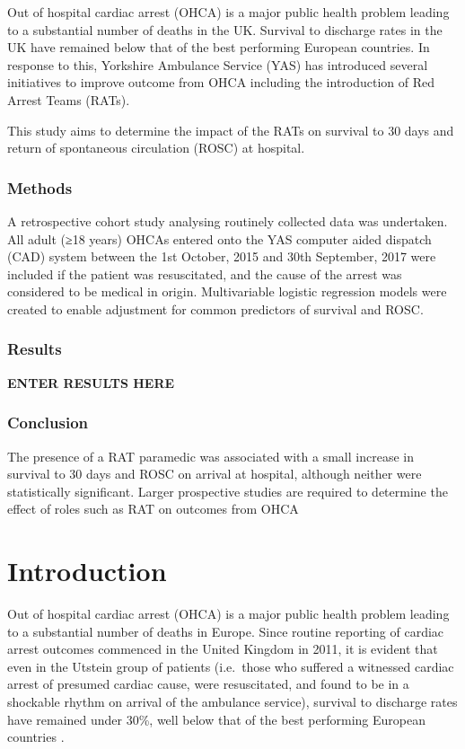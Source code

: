 \documentclass[]{article}
\theoremstyle{definition}
\theoremstyle{definition}
\theoremstyle{definition}
\theoremstyle{remark}
\begin{document}
Out of hospital cardiac arrest (OHCA) is a major public health problem
leading to a substantial number of deaths in the UK. Survival to
discharge rates in the UK have remained below that of the best
performing European countries. In response to this, Yorkshire Ambulance
Service (YAS) has introduced several initiatives to improve outcome from
OHCA including the introduction of Red Arrest Teams (RATs).

This study aims to determine the impact of the RATs on survival to 30
days and return of spontaneous circulation (ROSC) at hospital.

\hypertarget{methods}{%
\subsubsection{Methods}\label{methods}}

A retrospective cohort study analysing routinely collected data was
undertaken. All adult (≥18 years) OHCAs entered onto the YAS computer
aided dispatch (CAD) system between the 1st October, 2015 and 30th
September, 2017 were included if the patient was resuscitated, and the
cause of the arrest was considered to be medical in origin.
Multivariable logistic regression models were created to enable
adjustment for common predictors of survival and ROSC.

\hypertarget{results}{%
\subsubsection{Results}\label{results}}

\textbf{ENTER RESULTS HERE}

\hypertarget{conclusion}{%
\subsubsection{Conclusion}\label{conclusion}}

The presence of a RAT paramedic was associated with a small increase in
survival to 30 days and ROSC on arrival at hospital, although neither
were statistically significant. Larger prospective studies are required
to determine the effect of roles such as RAT on outcomes from OHCA

\hypertarget{intro}{%
\section{Introduction}\label{intro}}

Out of hospital cardiac arrest (OHCA) is a major public health problem
leading to a substantial number of deaths in Europe. Since routine
reporting of cardiac arrest outcomes commenced in the United Kingdom in
2011, it is evident that even in the Utstein group of patients
(i.e.~those who suffered a witnessed cardiac arrest of presumed cardiac
cause, were resuscitated, and found to be in a shockable rhythm on
arrival of the ambulance service), survival to discharge rates have
remained under 30\%, well below that of the best performing European
countries \citep{grasner_eureca_2016}.
\end{document}
